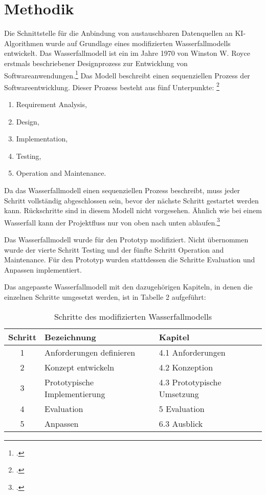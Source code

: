 \section{Methodik}
Die Schnittstelle für die Anbindung von austauschbaren Datenquellen an KI-Algorithmen wurde auf Grundlage eines modifizierten Wasserfallmodells entwickelt. Das Wasserfallmodell ist ein im Jahre 1970 von Winston W. Royce erstmals beschriebener Designprozess zur Entwicklung von Softwareanwendungen.\footcite{model2015waterfall} Das Modell beschreibt einen sequenziellen Prozess der Softwareentwicklung. Dieser Prozess besteht aus fünf Unterpunkte: \footcite{adenowo2013software}

\begin{enumerate}
\item Requirement Analysis,
\item Design,
\item Implementation,
\item Testing,
\item Operation and Maintenance.
\end{enumerate}

Da das Wasserfallmodell einen sequenziellen Prozess beschreibt, muss jeder Schritt vollständig abgeschlossen sein, bevor der nächste Schritt gestartet werden kann. Rückschritte sind in diesem Modell nicht vorgesehen. Ähnlich wie bei einem Wasserfall kann der Projektfluss nur von oben nach unten ablaufen.\footcite{PorathRon2020ICuI}

Das Wasserfallmodell wurde für den Prototyp modifiziert. Nicht übernommen wurde der vierte Schritt \glqq Testing\grqq{} und der fünfte Schritt \glqq Operation and Maintenance\grqq{}. Für den Prototyp wurden stattdessen die Schritte \glqq Evaluation\grqq{} und \glqq Anpassen\grqq{} implementiert.

Das angepasste Wasserfallmodell mit den dazugehörigen Kapiteln, in denen die einzelnen Schritte umgesetzt werden, ist in Tabelle 2 aufgeführt:

\begin{table}[H]
\centering
\begin{tabular}{c|l|l}
\textbf{Schritt} & \textbf{Bezeichnung} & \textbf{Kapitel}\\
\hline
1 & Anforderungen definieren & 4.1 Anforderungen\\
2 & Konzept entwickeln & 4.2 Konzeption\\
3 & Prototypische Implementierung & 4.3 Prototypische Umsetzung\\
4 & Evaluation & 5 Evaluation\\
5 & Anpassen & 6.3 Ausblick\\
\end{tabular}
\caption{Schritte des modifizierten Wasserfallmodells}
\end{table}

